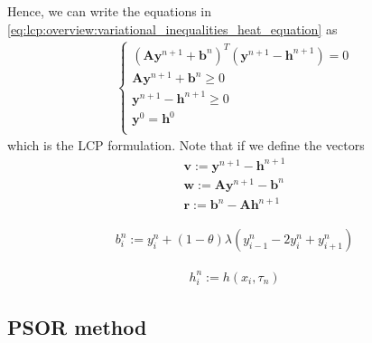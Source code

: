 Hence, we can write the equations in \eqref{eq:lcp:overview:variational_inequalities_heat_equation} as  
\begin{align}
  \begin{cases}
    (\mathbf{A}\mathbf{y}^{n+1} + \mathbf{b}^{n})^{T}(\mathbf{y}^{n+1}- \mathbf{h}^{n+1}) = 0\\
    \mathbf{A}\mathbf{y}^{n+1} + \mathbf{b}^{n} \ge 0\\
    \mathbf{y}^{n+1}- \mathbf{h}^{n+1} \ge 0 \\
    \mathbf{y}^{0} = \mathbf{h}^{0} \\  
  \end{cases}
  \label{eq:lcp:overview:variational_inequalities_heat_equation}
\end{align}
which is the LCP formulation. Note that if we define the vectors
\begin{align*}
  \mathbf{v} := \mathbf{y}^{n+1} - \mathbf{h}^{n+1} \\
  \mathbf{w} := \mathbf{A}\mathbf{y}^{n+1} - \mathbf{b}^{n} \\
  \mathbf{r} := \mathbf{b}^n - \mathbf{A}\mathbf{h}^{n+1}
\end{align*}

\begin{align}
    b^{n}_{i} := y^{n}_{i} + (1-\theta)\lambda(y^{n}_{i-1} - 2y^{n}_{i} + y^{n}_{i+1})
\end{align}

\begin{align}
  h^{n}_{i} := h(x_i, \tau_n)
\end{align}

\subsection{PSOR method}